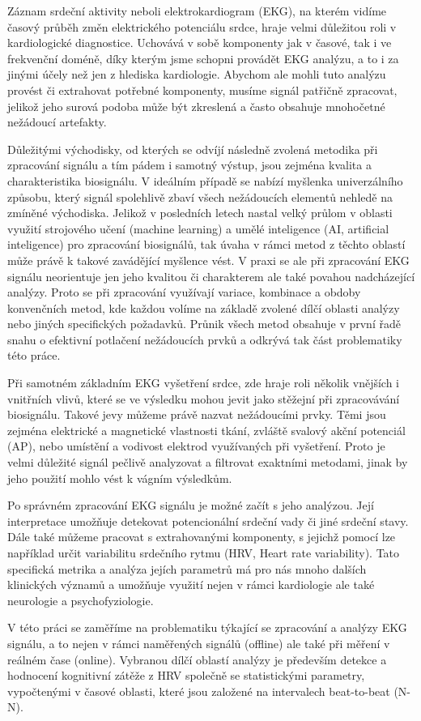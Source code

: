 Záznam srdeční aktivity neboli elektrokardiogram (EKG), na kterém vidíme časový
průběh změn elektrického potenciálu srdce, hraje velmi důležitou roli v
kardiologické diagnostice. Uchovává v sobě komponenty jak v časové, tak i ve
frekvenční doméně, díky kterým jsme schopni provádět EKG analýzu, a to i za
jinými účely než jen z hlediska kardiologie. Abychom ale mohli tuto analýzu
provést či extrahovat potřebné komponenty, musíme signál patřičně zpracovat,
jelikož jeho surová podoba může být zkreslená a často obsahuje mnohočetné
nežádoucí artefakty.

Důležitými východisky, od kterých se odvíjí následně zvolená metodika při
zpracování signálu a tím pádem i samotný výstup, jsou zejména kvalita a
charakteristika biosignálu. V ideálním případě se nabízí myšlenka univerzálního
způsobu, který signál spolehlivě zbaví všech nežádoucích elementů nehledě na
zmíněné východiska. Jelikož v posledních letech nastal velký průlom v oblasti
využití strojového učení (machine learning) a umělé inteligence (AI, artificial
inteligence) pro zpracování biosignálů, tak úvaha v rámci metod z těchto
oblastí může právě k takové zavádějící myšlence vést. V praxi se ale při
zpracování EKG signálu neorientuje jen jeho kvalitou či charakterem ale také
povahou nadcházející analýzy. Proto se při zpracování využívají variace,
kombinace a obdoby konvenčních metod, kde každou volíme na základě zvolené dílčí
oblasti analýzy nebo jiných specifických požadavků. Průnik všech metod obsahuje
v první řadě snahu o efektivní potlačení nežádoucích prvků a odkrývá tak část
problematiky této práce.

Při samotném základním EKG vyšetření srdce, zde hraje roli několik vnějších i
vnitřních vlivů, které se ve výsledku mohou jevit jako stěžejní při zpracovávání
biosignálu. Takové jevy můžeme právě nazvat nežádoucími prvky. Těmi jsou zejména
elektrické a magnetické vlastnosti tkání, zvláště svalový akční potenciál (AP),
nebo umístění a vodivost elektrod využívaných při vyšetření. Proto je velmi
důležité signál pečlivě analyzovat a filtrovat exaktními metodami, jinak by jeho
použití mohlo vést k vágním výsledkům. 

Po správném zpracování EKG signálu je možné začít s jeho analýzou. Její
interpretace umožňuje detekovat potencionální srdeční vady či jiné srdeční
stavy. Dále také můžeme pracovat s extrahovanými komponenty, s jejichž pomocí
lze například určit variabilitu srdečního rytmu (HRV, Heart rate variability).
Tato specifická metrika a analýza jejích parametrů má pro nás mnoho dalších
klinických významů a umožňuje využití nejen v rámci kardiologie ale také
neurologie a psychofyziologie.

V této práci se zaměříme na problematiku týkající se zpracování a analýzy EKG
signálu, a to nejen v rámci naměřených signálů (offline) ale také při měření v
reálném čase (online). Vybranou dílčí oblastí analýzy je především detekce a
hodnocení kognitivní zátěže z HRV společně se statistickými parametry,
vypočtenými v časové oblasti, které jsou založené na intervalech beat-to-beat
(N-N).
